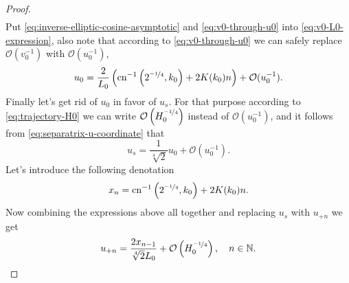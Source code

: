 \begin{proof}
\begin{equation}
\begin{split}
	\end{split}
	\label{eq:inverse-elliptic-cosine-asymptotic}
	\end{equation}
	Put \eqref{eq:inverse-elliptic-cosine-asymptotic} and \eqref{eq:v0-through-u0} into \eqref{eq:v0-L0-expression}, also note that according to \eqref{eq:v0-through-u0} we can safely replace $\mathcal{O}(v_0^{-1})$ with $\mathcal{O}(u_0^{-1})$,
	\begin{equation}
		u_0 = \frac{2}{L_0} \left( \mathrm{cn}^{-1} \left( 2^{\nicefrac{-1}{4}}, k_0 \right) + 2 K(k_0) n \right) + \mathcal{O}(u_0^{-1}).
	\label{eq:u0-expression}
	\end{equation}
	Finally let's get rid of $u_0$ in favor of $u_s$.
	For that purpose according to \eqref{eq:trajectory-H0} we can write $\mathcal{O}\left(H_0^{\nicefrac{-1}{4}}\right)$ instead of $\mathcal{O}(u_0^{-1})$, and it follows from \eqref{eq:separatrix-u-coordinate} that
	\begin{equation}
		u_s = \dfrac{1}{\sqrt[4]{2}} u_0 + \mathcal{O}(u_0^{-1}).	
	\end{equation}
	Let's introduce the following denotation
	\begin{equation}
		x_n = \mathrm{cn}^{-1} \left( 2^{\nicefrac{-1}{4}}, k_0 \right) + 2K(k_0)n.
	\label{eq:xn-first-group}
	\end{equation}
	Now combining the expressions above all together and replacing $u_s$ with $u_{+n}$ we get
	\begin{equation}
		u_{+n} = \frac{2 x_{n-1}}{\sqrt[4]{2} L_0} + \mathcal{O} \left( H_0^{\nicefrac{-1}{4}} \right), \quad n \in \mathbb{N}.
	\label{eq:un-final-positive}
	\end{equation}
	

\end{proof}
